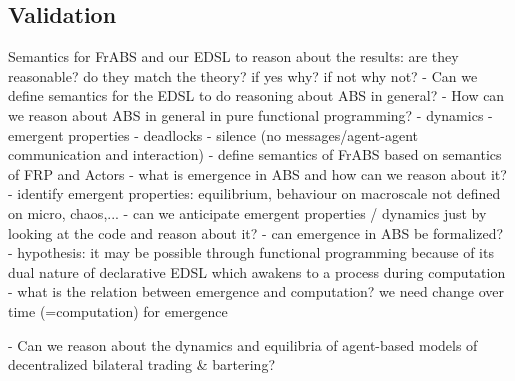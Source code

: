 \subsection{Validation}
Semantics for FrABS and our EDSL to reason about the results: are they reasonable? do they match the theory? if yes why? if not why not?
	- Can we define semantics for the EDSL to do reasoning about ABS in general?
	- How can we reason about ABS in general in pure functional programming?
		- dynamics
		- emergent properties
		- deadlocks
		- silence (no messages/agent-agent communication and interaction)
		- define semantics of FrABS based on semantics of FRP and Actors
		- what is emergence in ABS and how can we reason about it? 
			- identify emergent properties: equilibrium, behaviour on macroscale not defined on micro, chaos,...
			- can we anticipate emergent properties / dynamics just by looking at the code and reason about it?
			- can emergence in ABS be formalized?
				- hypothesis: it may be possible through functional programming because of its dual nature of declarative EDSL which awakens to a process during computation
					- what is the relation between emergence and computation? we need change over time (=computation) for emergence
					
		- Can we reason about the dynamics and equilibria of agent-based models of decentralized bilateral trading \& bartering?
